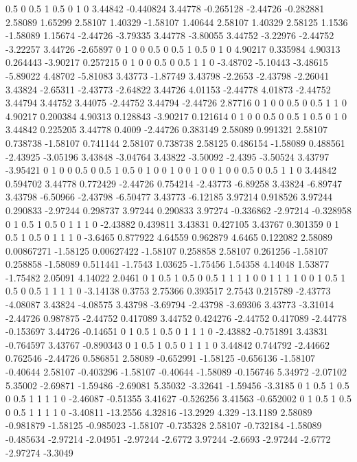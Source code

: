 0.5 0
0.5 1
0.5 0
1 0
3.44842 -0.440824
3.44778 -0.265128
-2.44726 -0.282881
2.58089 1.65299
2.58107 1.40329
-1.58107 1.40644
2.58107 1.40329
2.58125 1.1536
-1.58089 1.15674
-2.44726 -3.79335
3.44778 -3.80055
3.44752 -3.22976
-2.44752 -3.22257
3.44726 -2.65897
0 1
0 0
0.5 0
0.5 1
0.5 0
1 0
4.90217 0.335984
4.90313 0.264443
-3.90217 0.257215
0 1
0 0
0.5 0
0.5 1
1 0
-3.48702 -5.10443
-3.48615 -5.89022
4.48702 -5.81083
3.43773 -1.87749
3.43798 -2.2653
-2.43798 -2.26041
3.43824 -2.65311
-2.43773 -2.64822
3.44726 4.01153
-2.44778 4.01873
-2.44752 3.44794
3.44752 3.44075
-2.44752 3.44794
-2.44726 2.87716
0 1
0 0
0.5 0
0.5 1
1 0
4.90217 0.200384
4.90313 0.128843
-3.90217 0.121614
0 1
0 0
0.5 0
0.5 1
0.5 0
1 0
3.44842 0.225205
3.44778 0.4009
-2.44726 0.383149
2.58089 0.991321
2.58107 0.738738
-1.58107 0.741144
2.58107 0.738738
2.58125 0.486154
-1.58089 0.488561
-2.43925 -3.05196
3.43848 -3.04764
3.43822 -3.50092
-2.4395 -3.50524
3.43797 -3.95421
0 1
0 0
0.5 0
0.5 1
0.5 0
1 0
0 1
0 0
1 0
0 1
0 0
0.5 0
0.5 1
1 0
3.44842 0.594702
3.44778 0.772429
-2.44726 0.754214
-2.43773 -6.89258
3.43824 -6.89747
3.43798 -6.50966
-2.43798 -6.50477
3.43773 -6.12185
3.97214 0.918526
3.97244 0.290833
-2.97244 0.298737
3.97244 0.290833
3.97274 -0.336862
-2.97214 -0.328958
0 1
0.5 1
0.5 0
1 1
1 0
-2.43882 0.439811
3.43831 0.427105
3.43767 0.301359
0 1
0.5 1
0.5 0
1 1
1 0
-3.6465 0.877922
4.64559 0.962879
4.6465 0.122082
2.58089 0.00867271
-1.58125 0.00627422
-1.58107 0.258858
2.58107 0.261256
-1.58107 0.258858
-1.58089 0.511441
-1.7543 1.03625
-1.75456 1.54358
4.14048 1.53877
-1.75482 2.05091
4.14022 2.0461
0 1
0.5 1
0.5 0
0.5 1
1 1
1 0
0 1
1 1
1 0
0 1
0.5 1
0.5 0
0.5 1
1 1
1 0
-3.14138 0.3753
2.75366 0.393517
2.7543 0.215789
-2.43773 -4.08087
3.43824 -4.08575
3.43798 -3.69794
-2.43798 -3.69306
3.43773 -3.31014
-2.44726 0.987875
-2.44752 0.417089
3.44752 0.424276
-2.44752 0.417089
-2.44778 -0.153697
3.44726 -0.14651
0 1
0.5 1
0.5 0
1 1
1 0
-2.43882 -0.751891
3.43831 -0.764597
3.43767 -0.890343
0 1
0.5 1
0.5 0
1 1
1 0
3.44842 0.744792
-2.44662 0.762546
-2.44726 0.586851
2.58089 -0.652991
-1.58125 -0.656136
-1.58107 -0.40644
2.58107 -0.403296
-1.58107 -0.40644
-1.58089 -0.156746
5.34972 -2.07102
5.35002 -2.69871
-1.59486 -2.69081
5.35032 -3.32641
-1.59456 -3.3185
0 1
0.5 1
0.5 0
0.5 1
1 1
1 0
-2.46087 -0.51355
3.41627 -0.526256
3.41563 -0.652002
0 1
0.5 1
0.5 0
0.5 1
1 1
1 0
-3.40811 -13.2556
4.32816 -13.2929
4.329 -13.1189
2.58089 -0.981879
-1.58125 -0.985023
-1.58107 -0.735328
2.58107 -0.732184
-1.58089 -0.485634
-2.97214 -2.04951
-2.97244 -2.6772
3.97244 -2.6693
-2.97244 -2.6772
-2.97274 -3.3049
